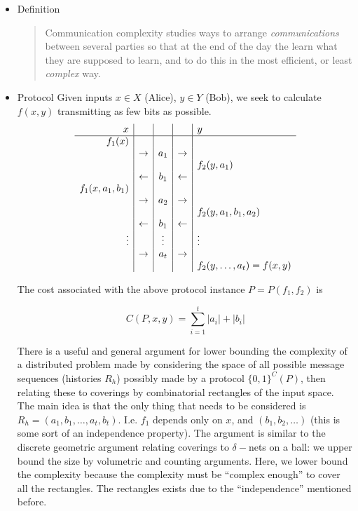\documentclass{article}
\newcommand{\ra}{\rightarrow}
\newcommand{\la}{\leftarrow}
\begin{document}
\begin{itemize}

\item Definition
    \begin{quote}
        Communication complexity studies ways to arrange {\it communications} between several parties so that at the end of the day the learn what they are supposed to learn, and to do this in the most efficient, or least {\it complex} way.
    \end{quote}


\item Protocol
    Given inputs $x \in X$ (Alice), $y \in Y$ (Bob), we seek to calculate $f(x,y)$ transmitting as few bits as possible.
    \[
    \begin{array}{r | c | c | c | l}
        x & & & & y \\
        \hline
        f_1(x) &     &     &     &            \\
               & \ra & a_1 & \ra &            \\
               &     &     &     & f_2(y,a_1) \\
               & \la & b_1 & \la &            \\
        f_1(x,a_1,b_1) &     &     &     &    \\
               & \ra & a_2 & \ra &            \\
               &     &     &     & f_2(y,a_1,b_1,a_2) \\
               & \la & b_1 & \la &            \\
        \vdots &     & \vdots    &  & \vdots  \\
               & \ra & a_t & \ra &            \\
               &     &     &     & f_2(y,\dots,a_t) = f(x,y) \\
    \end{array}
    \]

    The cost associated with the above protocol instance $P = P(f_1,f_2)$ is

    \[ C(P,x,y) = \sum_{i=1}^t |a_i| + |b_i| \]

    There is a useful and general argument for lower bounding the complexity of a distributed problem made by considering the space of all possible message sequences (histories $R_h$) possibly made by a protocol $\{0,1\}^C(P)$, then relating these to coverings by combinatorial rectangles of the input space.  The main idea is that the only thing that needs to be considered is $R_h = (a_1,b_1,\dots,a_t,b_t)$.  I.e. $f_1$ depends only on $x$, and $(b_1,b_2,\dots)$ (this is some sort of an independence property).  The argument is similar to the discrete geometric argument relating coverings to $\delta-$nets on a ball: we upper bound the size by volumetric and counting arguments.  Here, we lower bound the complexity because the complexity must be ``complex enough'' to cover all the rectangles.  The rectangles exists due to the ``independence'' mentioned before.

\end{itemize}
\end{document}
